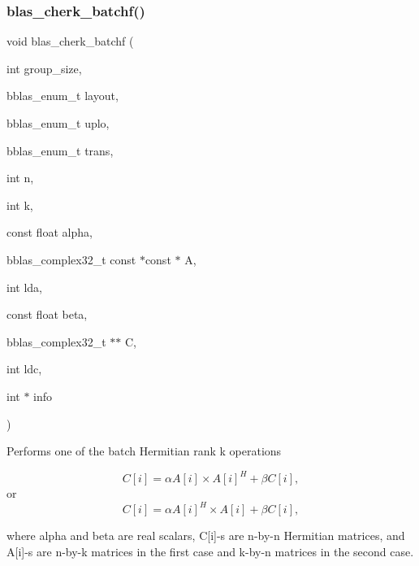 \subsubsection{\texorpdfstring{blas\+\_\+cherk\+\_\+batchf()}{blas\_cherk\_batchf()}}
{\footnotesize\ttfamily void blas\+\_\+cherk\+\_\+batchf (\begin{DoxyParamCaption}\item[{int}]{group\+\_\+size,  }\item[{bblas\+\_\+enum\+\_\+t}]{layout,  }\item[{bblas\+\_\+enum\+\_\+t}]{uplo,  }\item[{bblas\+\_\+enum\+\_\+t}]{trans,  }\item[{int}]{n,  }\item[{int}]{k,  }\item[{const float}]{alpha,  }\item[{bblas\+\_\+complex32\+\_\+t const $\ast$const $\ast$}]{A,  }\item[{int}]{lda,  }\item[{const float}]{beta,  }\item[{bblas\+\_\+complex32\+\_\+t $\ast$$\ast$}]{C,  }\item[{int}]{ldc,  }\item[{int $\ast$}]{info }\end{DoxyParamCaption})}

Performs one of the batch Hermitian rank k operations

\[ C[i] = \alpha A[i] \times A[i]^H + \beta C[i], \] or \[ C[i] = \alpha A[i]^H \times A[i] + \beta C[i], \]

where alpha and beta are real scalars, C\mbox{[}i\mbox{]}-\/s are n-\/by-\/n Hermitian matrices, and A\mbox{[}i\mbox{]}-\/s are n-\/by-\/k matrices in the first case and k-\/by-\/n matrices in the second case.


